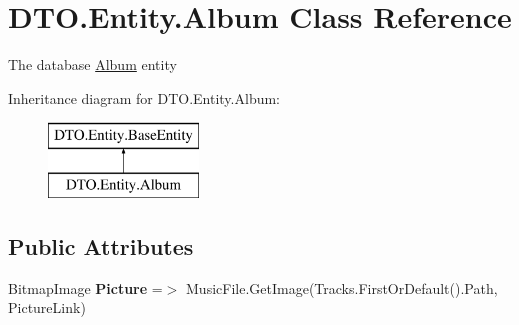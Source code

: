 \hypertarget{class_d_t_o_1_1_entity_1_1_album}{}\section{D\+T\+O.\+Entity.\+Album Class Reference}
\label{class_d_t_o_1_1_entity_1_1_album}


The database \hyperlink{class_d_t_o_1_1_entity_1_1_album}{Album} entity  


Inheritance diagram for D\+T\+O.\+Entity.\+Album\+:\begin{figure}[H]
\begin{center}
\leavevmode
\includegraphics[height=2.000000cm]{class_d_t_o_1_1_entity_1_1_album}
\end{center}
\end{figure}
\subsection*{Public Attributes}
\begin{DoxyCompactItemize}
\item 
\mbox{\label{class_d_t_o_1_1_entity_1_1_album_a6ee3fc6083829740b30a4d8061ffde6b}} 
Bitmap\+Image {\bfseries Picture} =$>$ Music\+File.\+Get\+Image(Tracks.\+First\+Or\+Default().Path, Picture\+Link)
\end{DoxyCompactItemize}
